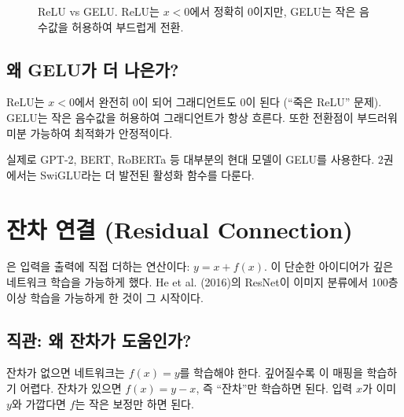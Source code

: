 \begin{figure}[htbp]
\centering
{}
\caption{ReLU vs GELU. ReLU는 $x < 0$에서 정확히 0이지만, GELU는 작은 음수값을 허용하여 부드럽게 전환.}
\label{fig:gelu-relu}
\end{figure}

\subsection{왜 GELU가 더 나은가?}

ReLU는 $x < 0$에서 완전히 0이 되어 그래디언트도 0이 된다 (``죽은 ReLU'' 문제). GELU는 작은 음수값을 허용하여 그래디언트가 항상 흐른다. 또한 전환점이 부드러워 미분 가능하여 최적화가 안정적이다.

실제로 GPT-2, BERT, RoBERTa 등 대부분의 현대 모델이 GELU를 사용한다. 2권에서는 SwiGLU라는 더 발전된 활성화 함수를 다룬다.

\section{잔차 연결 (Residual Connection)}

은 입력을 출력에 직접 더하는 연산이다: $y = x + f(x)$. 이 단순한 아이디어가 깊은 네트워크 학습을 가능하게 했다. He et al. (2016)의 ResNet이 이미지 분류에서 100층 이상 학습을 가능하게 한 것이 그 시작이다.

\subsection{직관: 왜 잔차가 도움인가?}

잔차가 없으면 네트워크는 $f(x) = y$를 학습해야 한다. 깊어질수록 이 매핑을 학습하기 어렵다. 잔차가 있으면 $f(x) = y - x$, 즉 ``잔차''만 학습하면 된다. 입력 $x$가 이미 $y$와 가깝다면 $f$는 작은 보정만 하면 된다.

